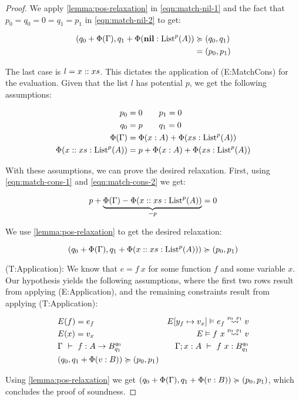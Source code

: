 \begin{proof}
   We apply \cref{lemma:pos-relaxation} in \cref{eqn:match-nil-1} and the fact that \(p_0 = q_0 = 0 = q_1 = p_1\) in \cref{eqn:match-nil-2} to get: 
   
   \begin{align}
      (q_0 + \Phi(\Gamma), q_1 + \Phi(\listnil : \ralist{p}{A})   &\relaxation (q_0, q_1) \label{eqn:match-nil-1}\\
                                                                  &= (p_0, p_1) \label{eqn:match-nil-2}
   \end{align}

   The last case is \(l = x :: xs\). This dictates the application of (E:MatchCons) for the evaluation. Given that the list \(l\) has potential \(p\), we get the following assumptions:

   \begin{align}
      p_0            &= 0 \qquad p_1 = 0\nonumber\\
      q_0            &= p \qquad q_1 = 0\nonumber\\
      \Phi(\Gamma)   &= \Phi(x : A) + \Phi(xs : \ralist{p}{A})\label{eqn:match-cons-1}\\
      \Phi(\cons{x}{xs} : \ralist{p}{A}) &= p + \Phi(x : A) + \Phi(xs : \ralist{p}{A})\label{eqn:match-cons-2}
   \end{align}

   With these assumptions, we can prove the desired relaxation. First, using \cref{eqn:match-cons-1} and \cref{eqn:match-cons-2} we get:

   \begin{align}
      p + \underbrace{\Phi(\Gamma) - \Phi(x :: xs : \text{List}^{p}(A))}_{-p} = 0
   \end{align}

   We use \cref{lemma:pos-relaxation} to get the desired relaxation:

   \[
      (q_0 + \Phi(\Gamma), q_1 + \Phi(x :: xs : \text{List}^{p}(A))) \succcurlyeq (p_0, p_1)
   \]

   (T:Application): We know that \(e = f~x\) for some function \(f\) and some variable \(x\). Our hypothesis yields the following assumptions, where the first two rows result from applying (E:Application), and the remaining constraints result from applying (T:Application):

   \begin{align}
      &E(f) = e_f                                      &\evals{\envaugment{E}{y_f}{v_x}}{e_f}{v}{p_0}{p_1} \nonumber\\
      &E(x) = v_x                                      &\evals{E}{f~x}{v}{p_0}{p_1} \nonumber\\
      &\typing{\Gamma}{f}{A \to \ratype{B}{q_0}{q_1}}  &\typing{\Gamma;x : A}{f~x}{\ratype{B}{q_0}{q_1}} \nonumber \\
      &(q_0, q_1 + \Phi(v : B)) \relaxation (p_0, p_1)
   \end{align}

   Using \cref{lemma:pos-relaxation} we get \((q_0 + \Phi(\Gamma), q_1 + \Phi(v : B)) \succcurlyeq (p_0, p_1)\), which concludes the proof of soundness.


\end{proof}
 
